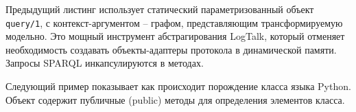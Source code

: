 \documentclass[conference]{IEEEtran} \IEEEoverridecommandlockouts
\begin{document}

Предыдущий листинг использует статический параметризованный объект \verb|query/1|, с контекст-аргументом -- графом, представляющим трансформируемую модельно. Это мощный инструмент абстрагирования LogTalk, который отменяет необходимость создавать объекты-адаптеры протокола в динамической памяти. Запросы SPARQL инкапсулируются в методах.



Следующий пример показывает как происходит порождение класса языка Python. Объект содержит публичные (public) методы для определения элементов класса.
\end{document}

